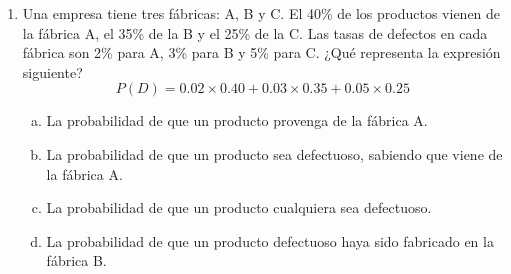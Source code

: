 \documentclass[a4paper]{article}
\begin{document}
\begin{enumerate}
\item Una empresa tiene tres fábricas: A, B y C. El 40\% de los productos vienen de la fábrica A, el 35\% de la B y el 25\% de la C. Las tasas de defectos en cada fábrica son 2\% para A, 3\% para B y 5\% para C. ¿Qué representa la expresión siguiente?
$$P(D) = 0.02 \times 0.40 + 0.03 \times 0.35 + 0.05 \times 0.25$$
\begin{enumerate}[a)]
    \item La probabilidad de que un producto provenga de la fábrica A.
    \item La probabilidad de que un producto sea defectuoso, sabiendo que viene de la fábrica A.
    \item La probabilidad de que un producto cualquiera sea defectuoso.
    \item La probabilidad de que un producto defectuoso haya sido fabricado en la fábrica B.
\end{enumerate}

\end{enumerate}


 
\end{document}
